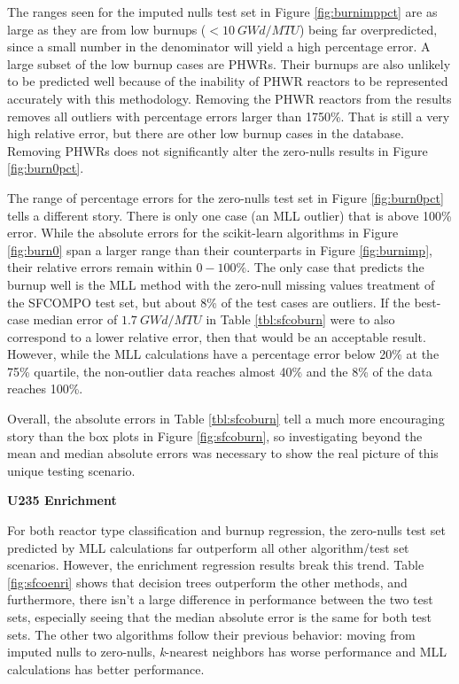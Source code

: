The ranges seen for the imputed nulls test set in Figure \ref{fig:burnimppct}
are as large as they are from low burnups ($< 10\:GWd/MTU$) being far
overpredicted, since a small number in the denominator will yield a high
percentage error. A large subset of the low burnup cases are \gls{PHWR}s.
Their burnups are also unlikely to be predicted well because of the inability
of \gls{PHWR} reactors to be represented accurately with this methodology.
Removing the \gls{PHWR} reactors from the results removes all outliers with
percentage errors larger than 1750\%. That is still a very high relative error,
but there are other low burnup cases in the database.  Removing \gls{PHWR}s
does not significantly alter the zero-nulls results in Figure
\ref{fig:burn0pct}.

The range of percentage errors for the zero-nulls test set in Figure
\ref{fig:burn0pct} tells a different story. There is only one case (an
\gls{MLL} outlier) that is above 100\% error.  While the absolute errors for
the scikit-learn algorithms in Figure \ref{fig:burn0} span a larger range than
their counterparts in Figure \ref{fig:burnimp}, their relative errors remain
within $0-100\%$. The only case that predicts the burnup well is the \gls{MLL}
method with the zero-null missing values treatment of the \gls{SFCOMPO} test
set, but about 8\% of the test cases are outliers.  If the best-case median
error of $1.7\:GWd/MTU$ in Table \ref{tbl:sfcoburn} were to also correspond to a
lower relative error, then that would be an acceptable result.  However, while
the \gls{MLL} calculations have a percentage error below 20\% at the 75\%
quartile, the non-outlier data reaches almost 40\% and the 8\% of the data
reaches 100\%.

Overall, the absolute errors in Table \ref{tbl:sfcoburn} tell a much more
encouraging story than the box plots in Figure \ref{fig:sfcoburn}, so
investigating beyond the mean and median absolute errors was necessary to show
the real picture of this unique testing scenario. 

\noindent \textbf{\gls{U235} Enrichment}

For both reactor type classification and burnup regression, the zero-nulls
test set predicted by \gls{MLL} calculations far outperform all other
algorithm/test set scenarios. However, the enrichment regression results break
this trend.  Table \ref{fig:sfcoenri} shows that decision trees outperform the
other methods, and furthermore, there isn't a large difference in performance
between the two test sets, especially seeing that the median absolute error is
the same for both test sets.  The other two algorithms follow their previous
behavior: moving from imputed nulls to zero-nulls, \textit{k}-nearest neighbors
has worse performance and \gls{MLL} calculations has better performance.


